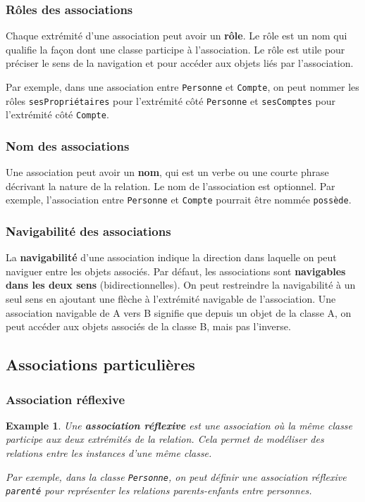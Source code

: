 \documentclass{article}
\newtheorem{example}{Example}
\begin{document}
\subsubsection{Rôles des associations}
Chaque extrémité d'une association peut avoir un \textbf{rôle}. Le rôle est un nom qui qualifie la façon dont une classe participe à l'association. Le rôle est utile pour préciser le sens de la navigation et pour accéder aux objets liés par l'association.

Par exemple, dans une association entre \texttt{Personne} et \texttt{Compte}, on peut nommer les rôles \texttt{sesPropriétaires} pour l'extrémité côté \texttt{Personne} et \texttt{sesComptes} pour l'extrémité côté \texttt{Compte}.

\subsubsection{Nom des associations}
Une association peut avoir un \textbf{nom}, qui est un verbe ou une courte phrase décrivant la nature de la relation. Le nom de l'association est optionnel.  Par exemple, l'association entre \texttt{Personne} et \texttt{Compte} pourrait être nommée \texttt{possède}.

\subsubsection{Navigabilité des associations}
La \textbf{navigabilité} d'une association indique la direction dans laquelle on peut naviguer entre les objets associés. Par défaut, les associations sont \textbf{navigables dans les deux sens} (bidirectionnelles). On peut restreindre la navigabilité à un seul sens en ajoutant une flèche à l'extrémité navigable de l'association.  Une association navigable de A vers B signifie que depuis un objet de la classe A, on peut accéder aux objets associés de la classe B, mais pas l'inverse.


\subsection{Associations particulières}

\subsubsection{Association réflexive}
\begin{example}
Une \textbf{association réflexive} est une association où la même classe participe aux deux extrémités de la relation. Cela permet de modéliser des relations entre les instances d'une même classe.

Par exemple, dans la classe \texttt{Personne}, on peut définir une association réflexive \texttt{parenté} pour représenter les relations parents-enfants entre personnes.
\end{example}
\end{document}
